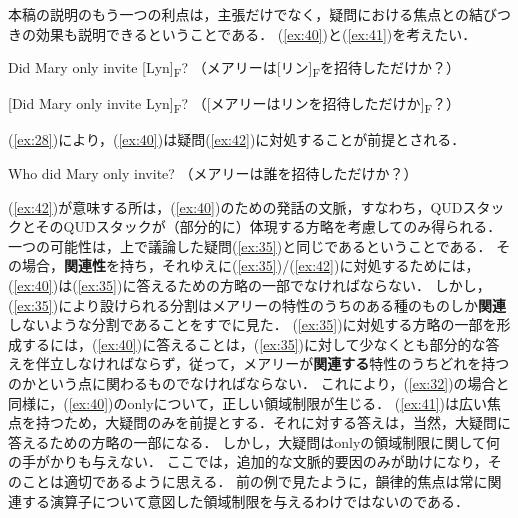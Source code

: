 \documentclass{goken}
\newcommand{\ori}[1]{\noindent\textcolor[gray]{0.7}{\fontsize{8pt}{8pt}\selectfont{\textsf{(p.~#1)}}} }
\begin{document}
本稿の説明のもう一つの利点は，主張だけでなく，疑問における焦点との結びつきの効果も説明できるということである．
(\ref{ex:40})と(\ref{ex:41})を考えたい．

\ori{45}
\begin{exe}
	\ex\label{ex:40} Did Mary only invite [Lyn]\textsubscript{F}? （メアリーは[リン]\textsubscript{F}を招待しただけか？）
\end{exe}

\begin{exe}
	\ex\label{ex:41} [Did Mary only invite Lyn]\textsubscript{F}? （[メアリーはリンを招待しただけか]\textsubscript{F}？）
\end{exe}

\noindent
(\ref{ex:28})により，(\ref{ex:40})は疑問(\ref{ex:42})に対処することが前提とされる．

\begin{exe}
	\ex\label{ex:42} Who did Mary only invite? （メアリーは誰を招待しただけか？）
\end{exe}

\noindent
(\ref{ex:42})が意味する所は，(\ref{ex:40})のための発話の文脈，すなわち，QUDスタックとそのQUDスタックが（部分的に）体現する方略を考慮してのみ得られる．
一つの可能性は，上で議論した疑問(\ref{ex:35})と同じであるということである．
その場合，\textbf{関連性}を持ち，それゆえに(\ref{ex:35})/(\ref{ex:42})に対処するためには，(\ref{ex:40})は(\ref{ex:35})に答えるための方略の一部でなければならない．
しかし，(\ref{ex:35})により設けられる分割はメアリーの特性のうちのある種のものしか\textbf{関連}しないような分割であることをすでに見た．
(\ref{ex:35})に対処する方略の一部を形成するには，(\ref{ex:40})に答えることは，(\ref{ex:35})に対して少なくとも部分的な答えを伴立しなければならず，従って，メアリーが\textbf{関連する}特性のうちどれを持つのかという点に関わるものでなければならない．
これにより，(\ref{ex:32})の場合と同様に，(\ref{ex:40})のonlyについて，正しい領域制限が生じる．
(\ref{ex:41})は広い焦点を持つため，大疑問のみを前提とする．それに対する答えは，当然，大疑問に答えるための方略の一部になる．%
しかし，大疑問はonlyの領域制限に関して何の手がかりも与えない．
ここでは，追加的な文脈的要因のみが助けになり，そのことは適切であるように思える．
前の例で見たように，韻律的焦点は常に関連する演算子について意図した領域制限を与えるわけではないのである．
\end{document}
